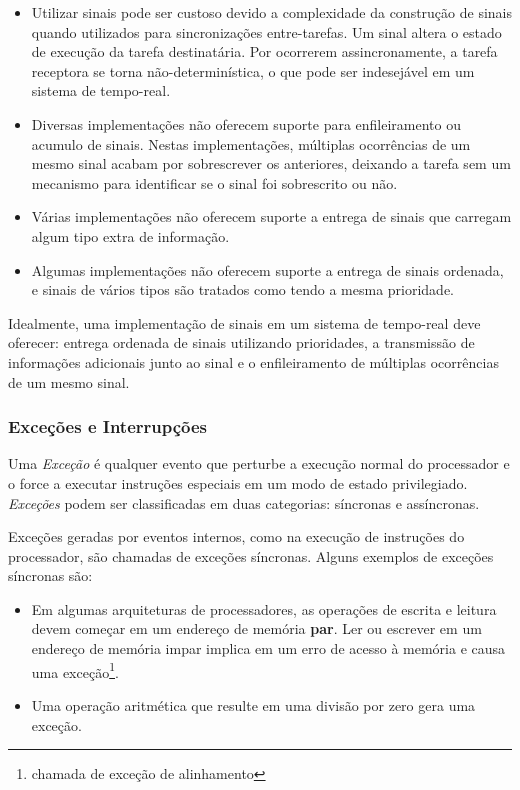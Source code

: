 \begin{itemize}
	\item Utilizar sinais pode ser custoso devido a complexidade da construção de sinais quando utilizados para sincronizações entre-tarefas. Um sinal altera o estado de execução da tarefa destinatária. Por ocorrerem assincronamente, a tarefa receptora se torna não-determinística, o que pode ser indesejável em um sistema de tempo-real.
	\item Diversas implementações não oferecem suporte para enfileiramento ou acumulo de sinais. Nestas implementações, múltiplas ocorrências de um mesmo sinal acabam por sobrescrever os anteriores, deixando a tarefa sem um mecanismo para identificar se o sinal foi sobrescrito ou não.
	\item Várias implementações não oferecem suporte a entrega de sinais que carregam algum tipo extra de informação.
	\item Algumas implementações não oferecem suporte a entrega de sinais ordenada, e sinais de vários tipos são tratados como tendo a mesma prioridade.
\end{itemize}

Idealmente, uma implementação de sinais em um sistema de tempo-real deve oferecer: entrega ordenada de sinais utilizando prioridades, a transmissão de informações adicionais junto ao sinal e o enfileiramento de múltiplas ocorrências de um mesmo sinal.


\subsubsection{Exceções e Interrupções}

Uma \emph{Exceção} é qualquer evento que perturbe a execução normal do processador e o force a executar instruções especiais em um modo de estado privilegiado. \emph{Exceções} podem ser classificadas em duas categorias: síncronas e assíncronas.

Exceções geradas por eventos internos, como na execução de instruções do processador, são chamadas de exceções síncronas. Alguns exemplos de exceções síncronas são:

\begin{itemize}
	\item Em algumas arquiteturas de processadores, as operações de escrita e leitura devem começar em um endereço de memória \textbf{par}. Ler ou escrever em um endereço de memória impar implica em um erro de acesso à memória e causa uma exceção\footnote{chamada de exceção de alinhamento}.

	\item Uma operação aritmética que resulte em uma divisão por zero gera uma exceção.
\end{itemize}

